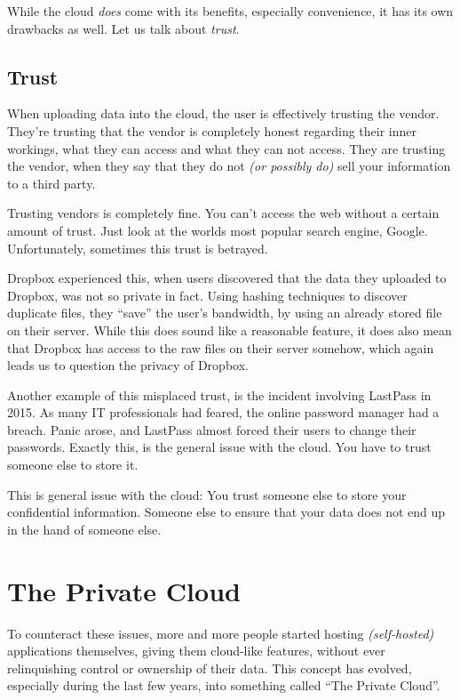 		While the cloud \emph{does} come with its benefits, especially convenience, it has its own drawbacks as well. Let us talk about \emph{trust}.

		\subsection*{Trust}
			When uploading data into the cloud, the user is effectively trusting the vendor. They're trusting that the vendor is completely honest regarding their inner workings, what they can access and what they can not access. They are trusting the vendor, when they say that they do not \emph{(or possibly do)} sell your information to a third party.

			Trusting vendors is completely fine. You can't access the web without a certain amount of trust. Just look at the worlds most popular search engine, Google. Unfortunately, sometimes this trust is betrayed.

			Dropbox experienced this, when users discovered that the data they uploaded to Dropbox, was not so private in fact. Using hashing techniques to discover duplicate files, they ``save'' the user's bandwidth, by using an already stored file on their server. While this does sound like a reasonable feature, it does also mean that Dropbox has access to the raw files on their server somehow, which again leads us to question the privacy of Dropbox.

			Another example of this misplaced trust, is the incident involving LastPass in 2015. As many IT professionals had feared, the online password manager had a breach. Panic arose, and LastPass almost forced their users to change their passwords. Exactly this, is the general issue with the cloud. You have to trust someone else to store it.


			This is general issue with the cloud: You trust someone else to store your confidential information. Someone else to ensure that your data does not end up in the hand of someone else.

	\section{The Private Cloud}
		To counteract these issues, more and more people started hosting \emph{(self-hosted)} applications themselves, giving them cloud-like features, without ever relinquishing control or ownership of their data. This concept has evolved, especially during the last few years, into something called ``The Private Cloud''. 


